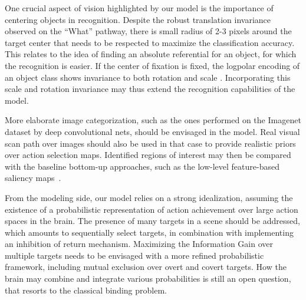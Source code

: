

One crucial aspect of vision highlighted by our model is the importance of centering objects in recognition. Despite the robust translation invariance observed on the ``What'' pathway, there is small radius of 2-3 pixels around the target center that needs to be respected to maximize the classification accuracy. This relates to the idea of finding an absolute referential for an object, for which the recognition is easier. If the center of fixation is fixed, the logpolar encoding of an object class shows invariance to both rotation and scale \citep{Traver10}. Incorporating this scale and rotation invariance may thus extend the recognition capabilities of the model.

More elaborate image categorization, such as the ones performed on the Imagenet dataset by deep convolutional nets, should be envisaged in the model.
Real visual scan path over images should also be used in that case to provide realistic priors over action selection maps.  %
Identified regions of interest may then be compared with the baseline bottom-up approaches, such as the low-level feature-based saliency maps~\citep{Itti01}. 


From the modeling side, our model relies on a strong idealization, assuming the existence of a probabilistic representation of action achievement over large action spaces in the brain. 
The presence of many targets in a scene should be addressed, which amounts to sequentially select targets, in combination with implementing an inhibition of return mechanism. Maximizing the Information Gain over multiple targets needs to be envisaged with a more refined probabilistic framework, including mutual exclusion over overt and covert targets.
How the brain may combine and integrate various probabilities is still an open question, that resorts to the classical binding problem. %
